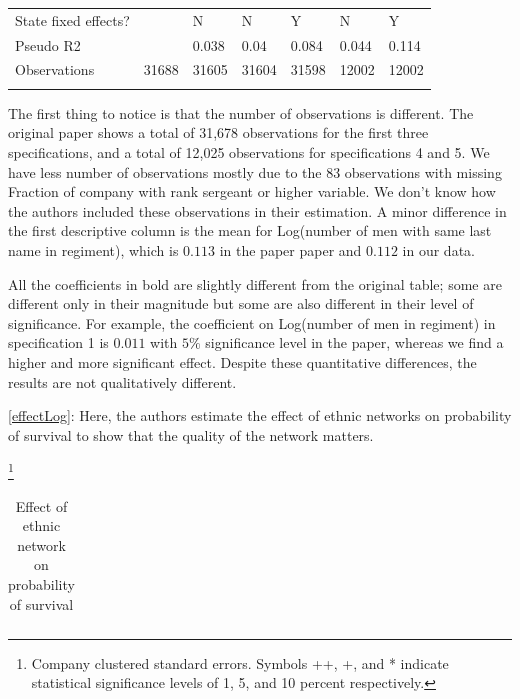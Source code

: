 \documentclass[a4paper]{report}\usepackage{graphicx, color}
\begin{document}
\begin{refsection}
\begin{table}
\begin{tabular}{lllllll}
State fixed effects?                               &        & N       & N       & Y       & N                                   & Y \\
Pseudo R2                                          &        & 0.038   & 0.04    & 0.084   & 0.044                               & 0.114 \\
Observations                                       & 31688  & 31605   & 31604   & 31598   & 12002                               & 12002 \\
                                                   &        &         &         &         &                                     &  \\
\end{tabular}
\end{table}

The first thing to notice is that the number of observations is different. The original paper shows a total of 31,678 observations for the first three specifications, and a total of 12,025 observations for specifications 4 and 5. We have less number of observations mostly due to the 83 observations with missing Fraction of company with rank sergeant or higher variable. We don’t know how the authors included these observations in their estimation.  A minor difference in the first descriptive column is the mean for Log(number of men with same last name in regiment), which is $0.113$ in the paper paper and $0.112$ in our data.

All the coefficients in bold are slightly different from the original table; some are different only in their magnitude but some are also different in their level of significance. For example, the coefficient on Log(number of men in regiment) in specification 1 is $0.011$ with $5\%$ significance level in the paper, whereas we find a higher and more significant effect. Despite these quantitative differences, the results are not qualitatively different.

\autoref{effectLog}: Here, the authors estimate the effect of ethnic networks on probability of survival to show that the quality of the network matters.

\begin{table}
\caption{Effect of ethnic network on probability of survival}\footnote{Company clustered standard errors. Symbols ++, +, and * indicate statistical significance levels of 1, 5, and 10 percent respectively.}
\label{ethnic}
\begin{tabular}{lllllll}
\hline


\end{tabular}
\end{table}
\end{refsection}
\end{document}
